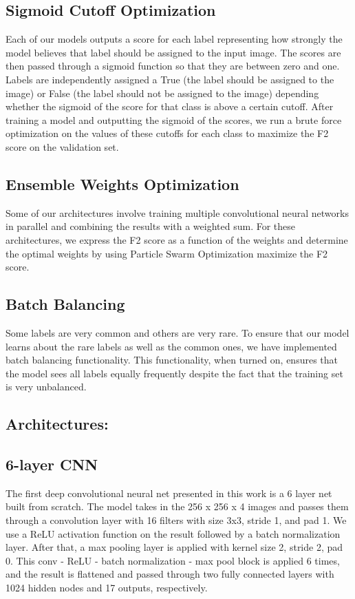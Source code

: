 \documentclass[10pt,twocolumn,letterpaper]{article}
\begin{document}
\subsection*{Sigmoid Cutoff Optimization} Each of our models outputs a score for each label representing how strongly the model believes that label should be assigned to the input image. The scores are then passed through a sigmoid function so that they are between zero and one. Labels are independently assigned a True (the label should be assigned to the image) or False (the label should not be assigned to the image) depending whether the sigmoid of the score for that class is above a certain cutoff. After training a model and outputting the sigmoid of the scores, we run a brute force optimization on the values of these cutoffs for each class to maximize the F2 score on the validation set.

\subsection*{Ensemble Weights Optimization} Some of our architectures involve training multiple convolutional neural networks in parallel and combining the results with a weighted sum. For these architectures, we express the F2 score as a function of the weights and determine the optimal weights by using Particle Swarm Optimization \cite{kennedy2011particle} maximize the F2 score.

\subsection*{Batch Balancing} Some labels are very common and others are very rare. To ensure that our model learns about the rare labels as well as the common ones, we have implemented batch balancing functionality. This functionality, when turned on, ensures that the model sees all labels equally frequently despite the fact that the training set is very unbalanced.

\subsection*{Architectures:}
\subsection*{6-layer CNN}

The first deep convolutional neural net presented in this work is a 6 layer net built from scratch. The model takes in the 256 x 256 x 4 images and passes them through a convolution layer with 16 filters with size 3x3, stride 1, and pad 1. We use a ReLU activation function on the result followed by a batch normalization layer. After that, a max pooling layer is applied with kernel size 2, stride 2, pad 0. This conv - ReLU - batch normalization - max pool block is applied 6 times, and the result is flattened and passed through two fully connected layers with 1024 hidden nodes and 17 outputs, respectively.
\end{document}
